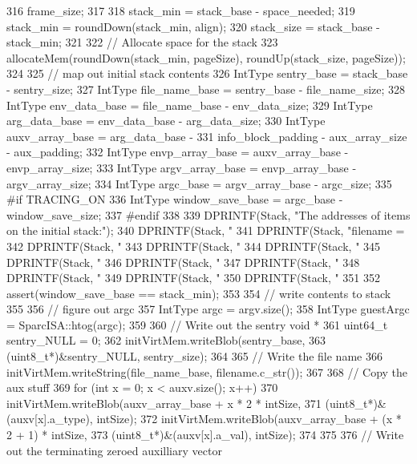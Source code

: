 \begin{DoxyCode}
{316         frame_size;
317 
318     stack_min = stack_base - space_needed;
319     stack_min = roundDown(stack_min, align);
320     stack_size = stack_base - stack_min;
321 
322     // Allocate space for the stack
323     allocateMem(roundDown(stack_min, pageSize), roundUp(stack_size, pageSize));
324 
325     // map out initial stack contents
326     IntType sentry_base = stack_base - sentry_size;
327     IntType file_name_base = sentry_base - file_name_size;
328     IntType env_data_base = file_name_base - env_data_size;
329     IntType arg_data_base = env_data_base - arg_data_size;
330     IntType auxv_array_base = arg_data_base -
331         info_block_padding - aux_array_size - aux_padding;
332     IntType envp_array_base = auxv_array_base - envp_array_size;
333     IntType argv_array_base = envp_array_base - argv_array_size;
334     IntType argc_base = argv_array_base - argc_size;
335 #if TRACING_ON
336     IntType window_save_base = argc_base - window_save_size;
337 #endif
338 
339     DPRINTF(Stack, "The addresses of items on the initial stack:\n");
340     DPRINTF(Stack, "%
341     DPRINTF(Stack, "filename = %
342     DPRINTF(Stack, "%
343     DPRINTF(Stack, "%
344     DPRINTF(Stack, "%
345     DPRINTF(Stack, "%
346     DPRINTF(Stack, "%
347     DPRINTF(Stack, "%
348     DPRINTF(Stack, "%
349     DPRINTF(Stack, "%
350     DPRINTF(Stack, "%
351 
352     assert(window_save_base == stack_min);
353 
354     // write contents to stack
355 
356     // figure out argc
357     IntType argc = argv.size();
358     IntType guestArgc = SparcISA::htog(argc);
359 
360     // Write out the sentry void *
361     uint64_t sentry_NULL = 0;
362     initVirtMem.writeBlob(sentry_base,
363             (uint8_t*)&sentry_NULL, sentry_size);
364 
365     // Write the file name
366     initVirtMem.writeString(file_name_base, filename.c_str());
367 
368     // Copy the aux stuff
369     for (int x = 0; x < auxv.size(); x++) {
370         initVirtMem.writeBlob(auxv_array_base + x * 2 * intSize,
371                 (uint8_t*)&(auxv[x].a_type), intSize);
372         initVirtMem.writeBlob(auxv_array_base + (x * 2 + 1) * intSize,
373                 (uint8_t*)&(auxv[x].a_val), intSize);
374     }
375 
376     // Write out the terminating zeroed auxilliary vector
}
\end{DoxyCode}
